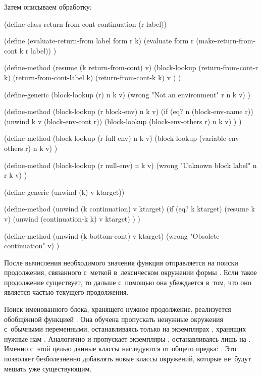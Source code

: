 \noindent
Затем описываем обработку:

\begin{code:lisp}
(define-class return-from-cont continuation (r label))

(define (evaluate-return-from label form r k)
  (evaluate form r (make-return-from-cont k r label)) )

(define-method (resume (k return-from-cont) v)
  (block-lookup (return-from-cont-r k)
                (return-from-cont-label k)
                (return-from-cont-k k)
                v ) )

(define-generic (block-lookup (r) n k v)
  (wrong "Not an environment" r n k v) )

(define-method (block-lookup (r block-env) n k v)
  (if (eq? n (block-env-name r))
      (unwind k v (block-env-cont r))
      (block-lookup (block-env-others r) n k v) ) )

(define-method (block-lookup (r full-env) n k v)
  (block-lookup (variable-env-others r) n k v) )

(define-method (block-lookup (r null-env) n k v)
  (wrong "Unknown block label" n r k v) )

(define-generic (unwind (k) v ktarget))

(define-method (unwind (k continuation) v ktarget)
  (if (eq? k ktarget)
      (resume k v)
      (unwind (continuation-k k) v ktarget) ) )

(define-method (unwind (k bottom-cont) v ktarget)
  (wrong "Obsolete continuation" v) )
\end{code:lisp}

После вычисления необходимого значения функция  отправляется
на поиски продолжения, связанного с~меткой  в~лексическом окружении
формы . Если такое продолжение существует, то дальше с~помощью
 она убеждается в~том, что оно является частью текущего продолжения.

Поиск именованного блока, хранящего нужное продолжение, реализуется обобщённой
функцией . Она обучена пропускать ненужные окружения с~обычными
переменными, останавливаясь только на экземплярах , хранящих
нужные нам . Аналогично и  пропускает экземпляры
, останавливаясь лишь на . Именно с~этой целью
данные классы наследуются от общего предка: . Это позволяет
безболезненно добавлять новые классы окружений, которые не~будут мешать уже
существующим.

